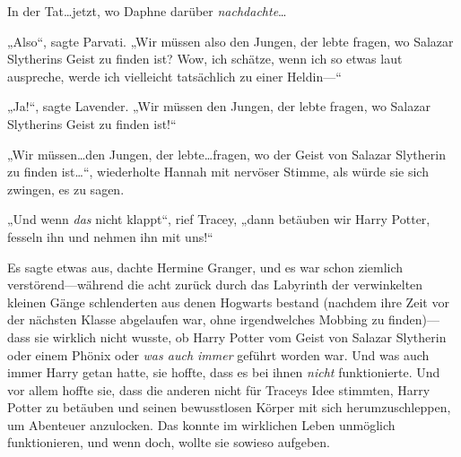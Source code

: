 In der Tat…jetzt, wo Daphne darüber \emph{nachdachte}…

„Also“, sagte Parvati. „Wir müssen also den Jungen, der lebte fragen, wo Salazar Slytherins Geist zu finden ist? Wow, ich schätze, wenn ich so etwas laut auspreche, werde ich vielleicht tatsächlich zu einer Heldin—“

„Ja!“, sagte Lavender. „Wir müssen den Jungen, der lebte fragen, wo Salazar Slytherins Geist zu finden ist!“

„Wir müssen…den Jungen, der lebte…fragen, wo der Geist von Salazar Slytherin zu finden ist…“, wiederholte Hannah mit nervöser Stimme, als würde sie sich zwingen, es zu sagen.

„Und wenn \emph{das} nicht klappt“, rief Tracey, „dann betäuben wir Harry Potter, fesseln ihn und nehmen ihn mit uns!“

\later

Es sagte etwas aus, dachte Hermine Granger, und es war schon ziemlich verstörend—während die acht zurück durch das Labyrinth der verwinkelten kleinen Gänge schlenderten aus denen Hogwarts bestand (nachdem ihre Zeit vor der nächsten Klasse abgelaufen war, ohne irgendwelches Mobbing zu finden)—dass sie wirklich nicht wusste, ob Harry Potter vom Geist von Salazar Slytherin oder einem Phönix oder \emph{was auch immer} geführt worden war. Und was auch immer Harry getan hatte, sie hoffte, dass es bei ihnen \emph{nicht} funktionierte. Und vor allem hoffte sie, dass die anderen nicht für Traceys Idee stimmten, Harry Potter zu betäuben und seinen bewusstlosen Körper mit sich herumzuschleppen, um Abenteuer anzulocken. Das konnte im wirklichen Leben unmöglich funktionieren, und wenn doch, wollte sie sowieso aufgeben.

